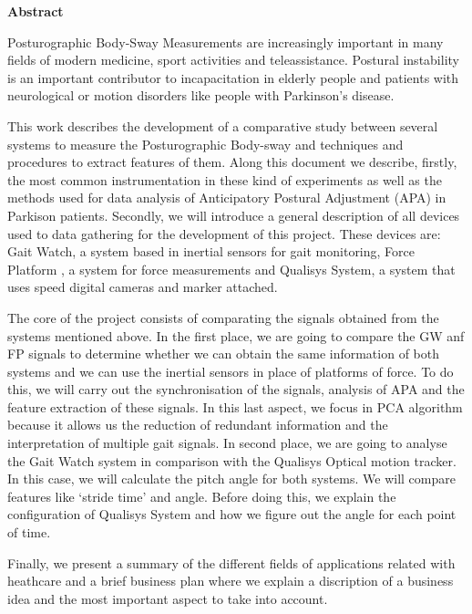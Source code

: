 \begin{titlepage}
\label{ch:abstract}
{ \huge \bfseries Abstract \\[0.4cm] }

Posturographic Body-Sway Measurements are increasingly important in many fields of modern medicine, sport activities and teleassistance.  Postural instability is an important contributor to incapacitation in elderly people and patients with neurological or motion disorders like people with Parkinson’s disease.

This work describes the development  of a comparative study between several systems to measure the Posturographic Body-sway and techniques and procedures to extract features of them. Along this document we describe, firstly, the most common  instrumentation in these kind of experiments as well as the methods  used for data analysis of Anticipatory Postural Adjustment (APA) in Parkison patients. Secondly, we will introduce a general description of all devices used to data gathering  for the development of  this project. These devices are: Gait Watch, a system based in inertial sensors for gait monitoring, Force Platform , a system for force measurements and Qualisys System, a system that uses speed digital cameras and marker attached.

The core of the project consists of comparating the signals obtained from the systems mentioned above. In the first place, we are going to compare the GW anf FP signals to determine whether we can obtain the same information of both systems and we can use the inertial sensors in place of platforms of force. To do this, we will carry out the synchronisation of the signals, analysis of APA and the feature extraction of these signals. In this last aspect, we focus in PCA algorithm because it allows us the reduction of redundant information and the interpretation of multiple gait signals. In second place, we are going to analyse the Gait Watch system in comparison with the Qualisys Optical motion tracker. In this case, we will calculate the pitch angle for both systems. We will compare features like ‘stride time’ and angle. Before doing this, we explain  the configuration of Qualisys System and how we figure out the angle for each point of time.

Finally, we present a summary of the different fields of applications related with heathcare and a brief  business plan where we explain a discription of a business idea and the most important aspect to take into account.

\end{titlepage} 
